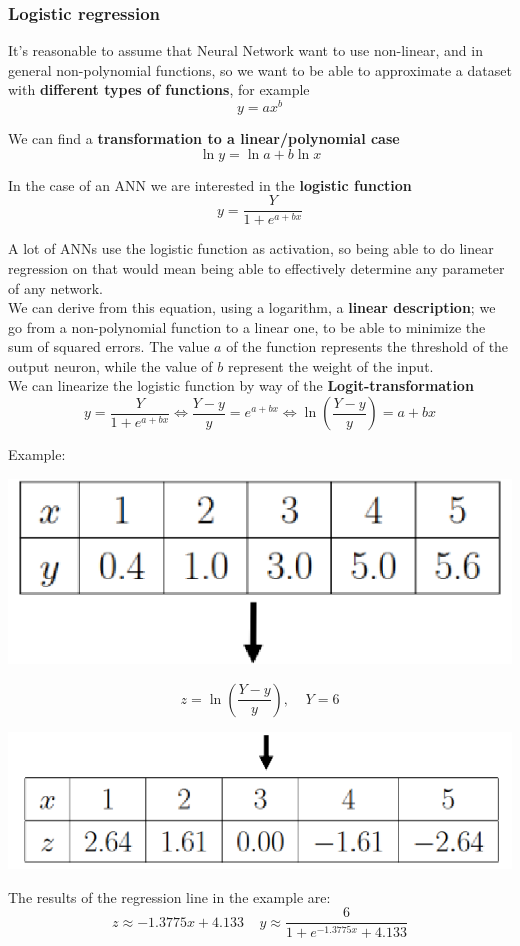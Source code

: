 \documentclass[11pt]{article}
\begin{document}
		\newpage
		
		\subsubsection{Logistic regression}
		It's reasonable to assume that Neural Network want to use non-linear, and in general non-polynomial functions, so we want to be able to approximate a dataset with \textbf{different types of functions}, for example
		$$ y = ax^b$$
		
		We can find a \textbf{transformation to a linear/polynomial case}
		$$ \ln y = \ln a + b \ln x $$
		
		In the case of an ANN we are interested in the \textbf{logistic function}
		$$ y = \frac{Y}{1 + e^{a+bx}} $$ 
		
		A lot of ANNs use the logistic function as activation, so being able to do linear regression on that would mean being able to effectively determine any parameter of any network.\\
		
		We can derive from this equation, using a logarithm, a \textbf{linear description}; we go from a non-polynomial function to a linear one, to be able to minimize the sum of squared errors. The value $a$ of the function represents the threshold of the output neuron, while the value of $b$ represent the weight of the input. \\
		
		We can linearize the logistic function by way of the \textbf{Logit-transformation}
		$$ y = \frac{Y}{1 + e^{a+bx}} \Leftrightarrow \frac{Y - y}{y} = e^{a + bx} \Leftrightarrow \ln \left(\frac{Y - y}{y}\right) = a + bx $$
		
		\newpage
		
		Example:
		\begin{center}
			\includegraphics[width=0.4\columnwidth]{img/NN/logreg1}
		\end{center}
		$$ z = \ln \left(\frac{Y - y}{y}\right), \;\;\;\; Y = 6$$
		\begin{center}
			\includegraphics[width=0.55\columnwidth]{img/NN/logreg2}
		\end{center}
		The results of the regression line in the example are:
		$$ z \approx -1.3775x + 4.133 \;\;\;\; y \approx \frac{6}{1 + e^{-1.3775x} + 4.133} $$
		
\end{document}
